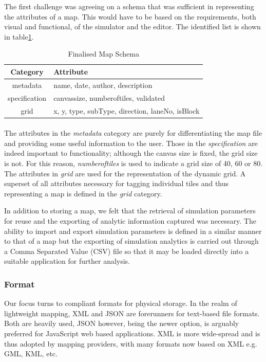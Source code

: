 The first challenge was agreeing on a schema that was sufficient in representing the attributes of a map.  This would have to be based on the requirements, both visual and functional, of the simulator and the editor.  The identified list is shown in table\ref{ref:mapTable}. 

\begin{table}[h]
\centering
\begin{tabular}{|c|l|}
	\hline
	\textbf{Category} & \textbf{Attribute} \\ \hline
	metadata & name, date, author, description \\ \hline
	specification & canvas\textunderscore size, number\textunderscore of\textunderscore tiles, validated \\ \hline
	grid & x, y, type, subType, direction, laneNo, isBlock \\ \hline
\end{tabular}
\caption{Finalised Map Schema}
\label{ref:mapTable}
\end{table}

\paragraph{}
The attributes in the \textit{metadata} category are purely for differentiating the map file and providing some useful information to the user. Those in the \textit{specification} are indeed important to functionality; although the canvas size is fixed, the grid size is not. For this reason, \textit{number\textunderscore of\textunderscore tiles} is used to indicate a grid size of 40, 60 or 80. The attributes in \textit{grid} are used for the representation of the dynamic grid.  A superset of all attributes necessary for tagging individual tiles and thus representing a map is defined in the \textit{grid} category.

In addition to storing a map, we felt that the retrieval of simulation parameters for reuse and the exporting of analytic information captured was necessary.  The ability to import and export simulation parameters is defined in a similar manner to that of a map but the exporting of simulation analytics is carried out through a Comma Separated Value (CSV) file so that it may be loaded directly into a suitable application for further analysis.

\subsubsection{Format}
Our focus turns to compliant formats for physical storage.  In the realm of lightweight mapping, XML and JSON are forerunners for text-based file formats.  Both are heavily used, JSON however, being the newer option, is arguably preferred for JavaScript web based applications.  XML is more wide-spread and is thus adopted by mapping providers, with many formats now based on XML e.g. GML, KML, etc.
 
